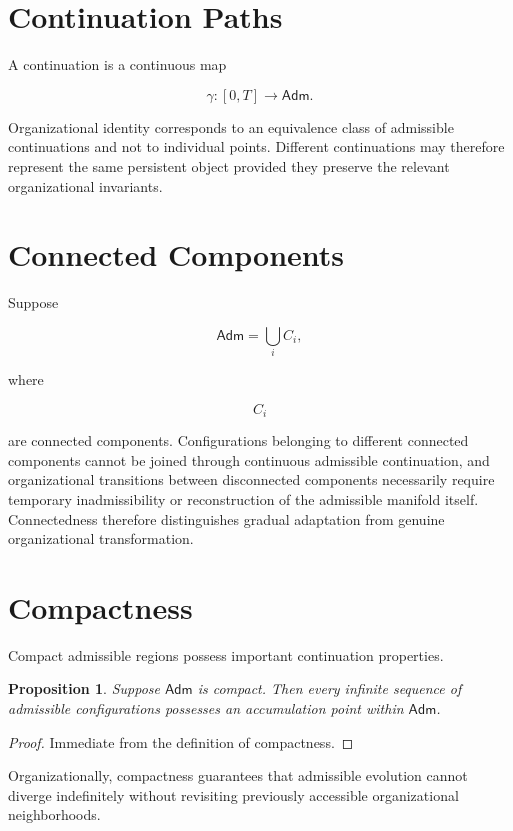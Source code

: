 \documentclass[11pt,oneside]{book}
\numberwithin{equation}{chapter}
\theoremstyle{definition}
\theoremstyle{plain}
\newtheorem{proposition}[definition]{Proposition}
\newcommand{\Adm}{\mathsf{Adm}}
\begin{document}
\section{Continuation Paths}

A continuation is a continuous map

\[
\gamma
:
[0,T]
\rightarrow
\Adm.
\]

Organizational identity corresponds to an equivalence class of admissible continuations and not to individual points. Different continuations may therefore represent the same persistent object provided they preserve the relevant organizational invariants.

\section{Connected Components}

Suppose

\[
\Adm
=
\bigcup_i
C_i,
\]

where

\[
C_i
\]

are connected components. Configurations belonging to different connected components cannot be joined through continuous admissible continuation, and organizational transitions between disconnected components necessarily require temporary inadmissibility or reconstruction of the admissible manifold itself. Connectedness therefore distinguishes gradual adaptation from genuine organizational transformation.

\section{Compactness}

Compact admissible regions possess important continuation properties.

\begin{proposition}
Suppose \(\Adm\) is compact. Then every infinite sequence of admissible
configurations possesses an accumulation point within \(\Adm\).
\end{proposition}

\begin{proof}
Immediate from the definition of compactness.
\end{proof}

Organizationally, compactness guarantees that admissible evolution cannot
diverge indefinitely without revisiting previously accessible
organizational neighborhoods.
\end{document}
